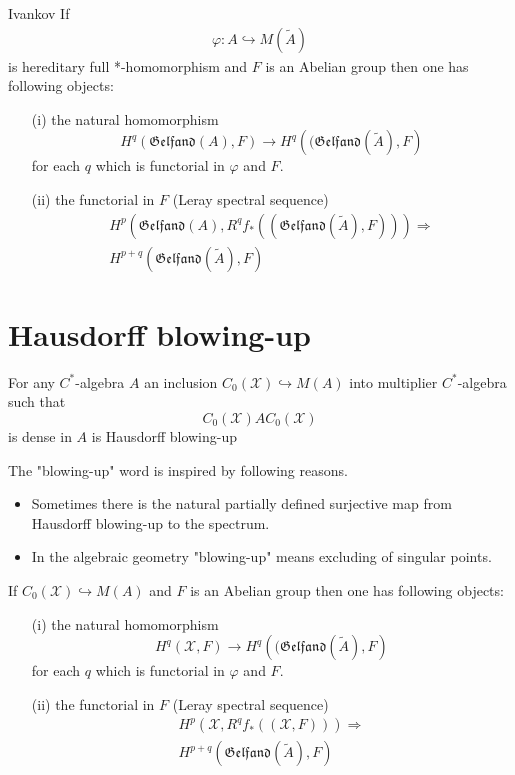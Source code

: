 \documentclass{beamer}
\theoremstyle{plain}
\newcommand{\bean}{\begin{eqnarray*}}
\newcommand{\eean}{\end{eqnarray*}}
\newcommand{\sX}{\mathcal{X}}       %
\newcommand{\hookto}{\hookrightarrow}        %
\begin{document}
\begin{frame}
\begin{lemma}\alert{Ivankov}
	If 	
	\bean
	\varphi: A \hookto M\left(\widetilde A\right)
	\eean
	is hereditary full  *-homomorphism  and $F$ is an Abelian group then one has following objects:
	\begin{enumerate}		\item [(i)] 
	 the natural homomorphism $$H^q\left(\mathfrak{Gelfand}\left( A\right) , F \right) \xrightarrow{} H^q \left((\mathfrak{Gelfand}\left( \widetilde A\right), F\right)$$ for each $q$ which is functorial in $\varphi$ and  $F$.
		\item [(ii)] the functorial in $F$  (Leray spectral sequence)
		\bean H^p\left(\mathfrak{Gelfand}\left( A\right), R^qf_*\left(\left(\mathfrak{Gelfand}\left( \widetilde A\right), F \right) \right) \right)\Rightarrow \\ H^{p + q}\left(\mathfrak{Gelfand}\left( \widetilde A\right), F \right)
		\eean
	\end{enumerate}
\end{lemma}
\end{frame}
\section{Hausdorff blowing-up}
\begin{frame}
	\begin{definition}\label{blowing_up_defn}
		For any $C^*$-algebra $A$ 
		an inclusion $C_0\left( \sX\right) \hookto M\left(A \right)$ into multiplier $C^*$-algebra  such that
		$$
		C_0\left( \sX\right)AC_0\left( \sX\right)
		$$
		is dense in $A$ is \alert{Hausdorff blowing-up}
	\end{definition}
	The "blowing-up" word is inspired by following reasons.
	\begin{itemize}
		\item Sometimes there is  the natural partially defined  surjective  map from  Hausdorff blowing-up to the spectrum.
		\item  In the algebraic geometry   "blowing-up" means  excluding of singular points.
	\end{itemize}
\end{frame}
\begin{frame}
	\begin{lemma}
If $C_0\left( \sX\right) \hookto M\left(A \right)$ and $F$ is an Abelian group then one has following objects:
	\begin{enumerate}		\item [(i)] 
	the natural homomorphism $$H^q\left(\sX , F \right) \xrightarrow{} H^q \left((\mathfrak{Gelfand}\left( \widetilde A\right), F\right)$$ for each $q$ which is functorial in $\varphi$ and  $F$.
	\item [(ii)] the functorial in $F$  (Leray spectral sequence)
	\bean H^p\left(\sX, R^qf_*\left(\left(\sX, F \right) \right) \right)\Rightarrow \\ H^{p + q}\left(\mathfrak{Gelfand}\left( \widetilde A\right), F \right)
	\eean
\end{enumerate}
	\end{lemma}
\end{frame}
\end{document}
